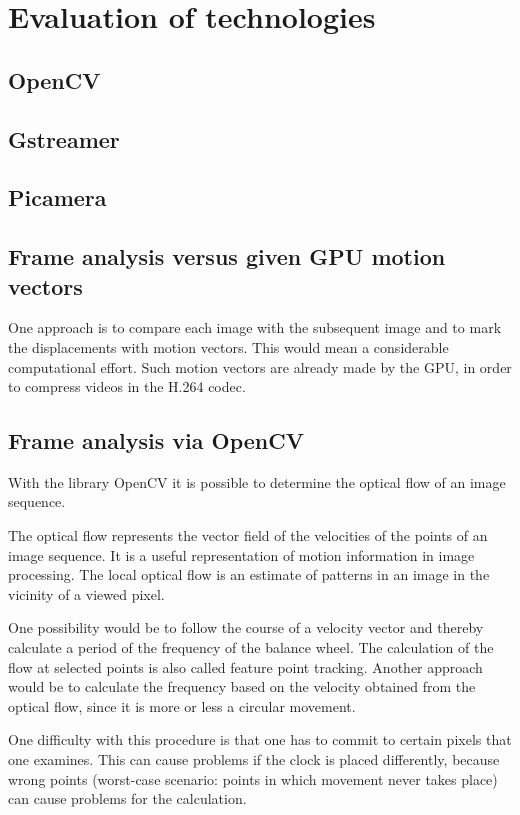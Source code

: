 \documentclass[12pt, a4paper]{report}
\begin{document}
    \section{Evaluation of technologies}
    \subsection{OpenCV}
    \subsection{Gstreamer}
    \subsection{Picamera}
    
    \subsection{Frame analysis versus given GPU motion vectors}
    One approach is to compare each image with the subsequent image and to mark the displacements with motion vectors. This would mean a considerable computational effort.
    Such motion vectors are already made by the GPU, in order to compress videos in the H.264 codec.
    
    \subsection{Frame analysis via OpenCV}
    With the library OpenCV it is possible to determine the optical flow of an image sequence. 
    
    The optical flow represents the vector field of the velocities of the points of an image sequence. It is a useful representation of motion information in image processing. The local optical flow is an estimate of patterns in an image in the vicinity of a viewed pixel. 
    
    One possibility would be to follow the course of a velocity vector and thereby calculate a period of the frequency of the balance wheel. The calculation of the flow at selected points is also called feature point tracking. Another approach would be to calculate the frequency based on the velocity obtained from the optical flow, since it is more or less a circular movement. 
    
    One difficulty with this procedure is that one has to commit to certain pixels that one examines. This can cause problems if the clock is placed differently, because wrong points (worst-case scenario: points in which movement never takes place) can cause problems for the calculation.  
    
\end{document}
